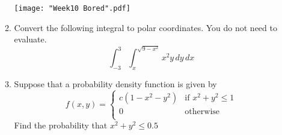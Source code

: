 \documentclass{article}
\begin{document}
\begin{itemize}
\begin{enumerate}
                   \begin{center}
                       \texttt{[image: "Week10 Bored".pdf]}
                   \end{center}
                   
                   \item Convert the following integral to polar coordinates. You do not need to evaluate.
                   $$\int_{-3}^3 \int_x^{\sqrt{9-x^2}} x^2y\,dy\,dx$$
                   
                   \item Suppose that a probability density function is given by 
                   $$ f(x,y) = \begin{cases} 
                        c(1-x^2-y^2) & \text{if } x^2+y^2\leq 1 \\
                        0 & \text{otherwise} \\
                        \end{cases}
                    $$
                    Find the probability that $x^2+y^2 \leq 0.5$
 

                \end{enumerate}
        \end{itemize}
\end{document}
